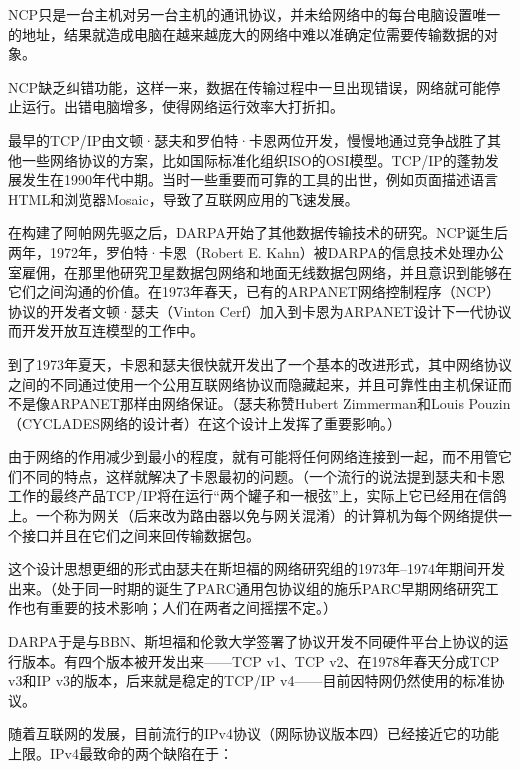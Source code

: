 \begin{compactenum}
\item NCP只是一台主机对另一台主机的通讯协议，并未给网络中的每台电脑设置唯一的地址，结果就造成电脑在越来越庞大的网络中难以准确定位需要传输数据的对象。
\item NCP缺乏纠错功能，这样一来，数据在传输过程中一旦出现错误，网络就可能停止运行。出错电脑增多，使得网络运行效率大打折扣。
\end{compactenum}






最早的TCP/IP由文顿·瑟夫和罗伯特·卡恩两位开发，慢慢地通过竞争战胜了其他一些网络协议的方案，比如国际标准化组织ISO的OSI模型。TCP/IP的蓬勃发展发生在1990年代中期。当时一些重要而可靠的工具的出世，例如页面描述语言HTML和浏览器Mosaic，导致了互联网应用的飞速发展。

在构建了阿帕网先驱之后，DARPA开始了其他数据传输技术的研究。NCP诞生后两年，1972年，罗伯特·卡恩（Robert E. Kahn）被DARPA的信息技术处理办公室雇佣，在那里他研究卫星数据包网络和地面无线数据包网络，并且意识到能够在它们之间沟通的价值。在1973年春天，已有的ARPANET网络控制程序（NCP）协议的开发者文顿·瑟夫（Vinton Cerf）加入到卡恩为ARPANET设计下一代协议而开发开放互连模型的工作中。

到了1973年夏天，卡恩和瑟夫很快就开发出了一个基本的改进形式，其中网络协议之间的不同通过使用一个公用互联网络协议而隐藏起来，并且可靠性由主机保证而不是像ARPANET那样由网络保证。（瑟夫称赞Hubert Zimmerman和Louis Pouzin（CYCLADES网络的设计者）在这个设计上发挥了重要影响。）

由于网络的作用减少到最小的程度，就有可能将任何网络连接到一起，而不用管它们不同的特点，这样就解决了卡恩最初的问题。（一个流行的说法提到瑟夫和卡恩工作的最终产品TCP/IP将在运行“两个罐子和一根弦”上，实际上它已经用在信鸽上。一个称为网关（后来改为路由器以免与网关混淆）的计算机为每个网络提供一个接口并且在它们之间来回传输数据包。

这个设计思想更细的形式由瑟夫在斯坦福的网络研究组的1973年–1974年期间开发出来。（处于同一时期的诞生了PARC通用包协议组的施乐PARC早期网络研究工作也有重要的技术影响；人们在两者之间摇摆不定。）

DARPA于是与BBN、斯坦福和伦敦大学签署了协议开发不同硬件平台上协议的运行版本。有四个版本被开发出来——TCP v1、TCP v2、在1978年春天分成TCP v3和IP v3的版本，后来就是稳定的TCP/IP v4——目前因特网仍然使用的标准协议。

随着互联网的发展，目前流行的IPv4协议（网际协议版本四）已经接近它的功能上限。IPv4最致命的两个缺陷在于：

